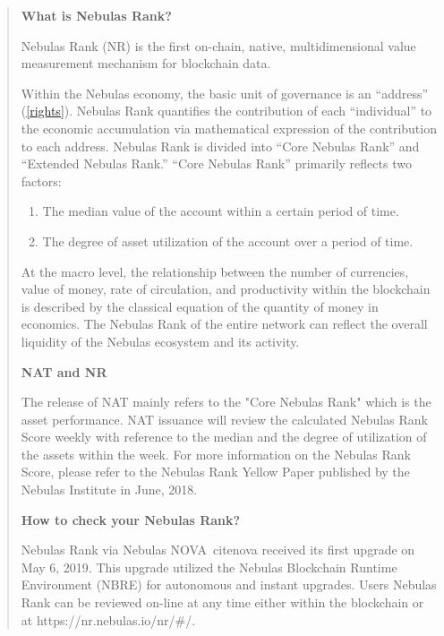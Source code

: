 \begin{quote}
	\textbf{What is Nebulas Rank?}
		
	Nebulas Rank (NR) is the first on-chain, native, multidimensional value measurement mechanism for blockchain data.

	Within the Nebulas economy, the basic unit of governance is an “address” (\ref{rights}). Nebulas Rank quantifies the contribution of each “individual” to the economic accumulation via mathematical expression of the contribution to each address. Nebulas Rank is divided into “Core Nebulas Rank” and “Extended Nebulas Rank.” “Core Nebulas Rank” primarily reflects two factors:

	\begin{enumerate}
		\item The median value of the account within a certain period of time.
		\item The degree of asset utilization of the account over a period of time.
	\end{enumerate}

	At the macro level, the relationship between the number of currencies, value of money, rate of circulation, and productivity within the blockchain is described by the classical equation of the quantity of money in economics. The Nebulas Rank of the entire network can reflect the overall liquidity of the Nebulas ecosystem and its activity.

	\vspace{2em}

	\textbf{NAT and NR}

	The release of NAT mainly refers to the "Core Nebulas Rank" which is the asset performance. NAT issuance will review the calculated Nebulas Rank Score weekly with reference to the median and the degree of utilization of the assets within the week. For more information on the Nebulas Rank Score, please refer to the Nebulas Rank Yellow Paper published by the Nebulas Institute in June, 2018.

	\vspace{2em}

	\textbf{How to check your Nebulas Rank?}

Nebulas Rank via Nebulas NOVA~cite{nova} received its first upgrade on May 6, 2019. This upgrade utilized the Nebulas Blockchain Runtime Environment (NBRE) for autonomous and instant upgrades. Users Nebulas Rank can be reviewed on-line at any time either within the blockchain or at https://nr.nebulas.io/nr/#/.
\end{quote}


